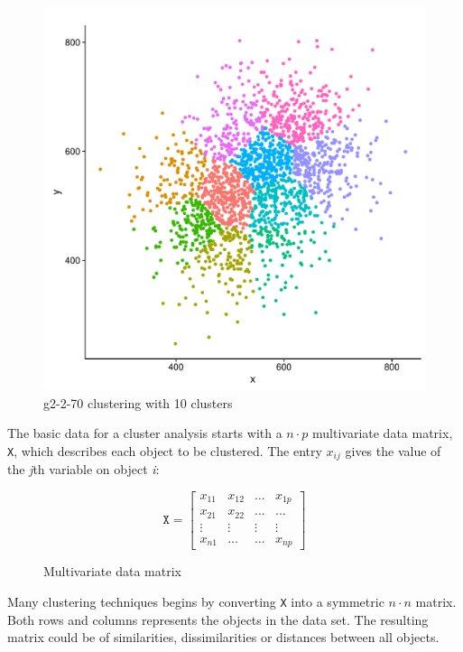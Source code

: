 \documentclass[a4paper,10pt]{article}
\theoremstyle{plain}
\theoremstyle{definition}
\begin{document}
\begin{figure}[H]
	\centering
	\includegraphics[scale=0.4]{./pictures/G2/g2-2-70-k10.pdf}
	\caption{g2-2-70 clustering with 10 clusters}
	\label{fig:g2-2-70-k10}
\end{figure}
The basic data for a cluster analysis starts with a $n \cdot p$ multivariate data matrix, \texttt{X}, which describes each object to be clustered. The entry $x_{ij}$ gives the value of the \textit{j}th variable on object \textit{i}:
\begin{figure}[H]
	\centering
	\[
	\texttt{X}
	=
	\begin{bmatrix}
	x_{11} & x_{12} & \dots & x_{1p} \\
	x_{21} & x_{22} & \dots & \dots \\
	\vdots & \vdots & \vdots & \vdots \\
	x_{n1} & \dots & \dots & x_{np}
	\end{bmatrix}
	\]
	\caption{Multivariate data matrix}
	\label{fig:dataMatrix}
\end{figure}

Many clustering techniques begins by converting \texttt{X} into a symmetric $n \cdot n$ matrix. Both rows and columns represents the objects in the data set. The resulting matrix could be of similarities, dissimilarities or distances between all objects.\\
\end{document}
